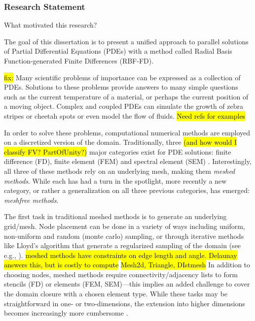 \documentclass[11pt]{report}
\begin{document}
\subsubsection{Research Statement} 
What motivated this research?
\label{sec:intro}

The goal of this dissertation is to present a unified approach
to parallel solutions of Partial Differential Equations (PDEs)
with a method called Radial Basis Function-generated Finite
Differences (RBF-FD).

\hl{fix:}
Many scientific problems of importance can be expressed as a
collection of PDEs. Solutions to these problems provide answers to many simple
questions such as the current temperature of a material, or perhaps the
current position of a moving object. Complex and coupled PDEs can simulate the growth of zebra stripes or cheetah spots \cite{FuselierWright2012} or even model the flow of fluids. \hl{Need refs for examples}


In order to solve these problems, computational numerical
methods are employed on a discretized version of the domain.
Traditionally, three \hl{(and how would I classify FV? PartOfUnity?)} major categories exist for PDE solutions:
finite difference (FD), finite element (FEM) and spectral
element (SEM) \cite{Fasshauer2007}. Interestingly, all three of
these methods rely on an underlying mesh, making them
\emph{meshed methods}. While each has had a turn in the
spotlight, more recently a new category, or rather a
generalization on all three previous categories, has emerged:
\emph{meshfree methods}.

The first task in traditional meshed methods is to generate an
underlying grid/mesh. Node placement can be done in a variety of
ways including uniform, non-uniform and random (monte carlo)
sampling, or through iterative methods like Lloyd's algorithm
that generate a regularized sampling of the domain (see e.g.,
\cite{Du1999}). \hl{meshed methods have constraints on edge length and angle. Delaunay answers this, but is costly to compute}
\hl{Mesh2d, Triangle, DIstmesh} In addition to choosing nodes, meshed methods
require connectivity/adjacency lists to form stencils (FD) or
elements (FEM, SEM)---this implies an added challenge to cover
the domain closure with a chosen element type. While these tasks
may be straightforward in one- or two-dimensions, the extension
into higher dimensions becomes increasingly more cumbersome
\cite{Li2007}. 
\end{document}
